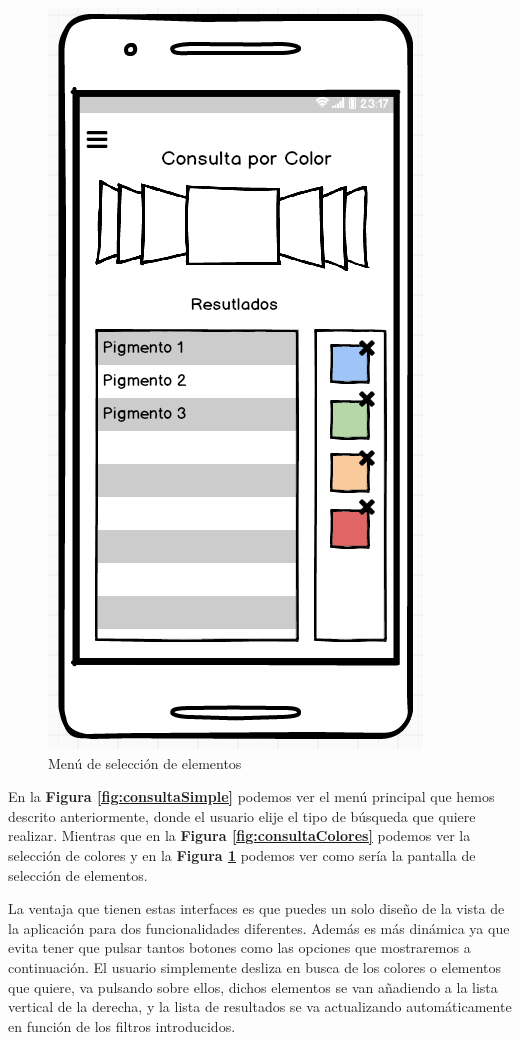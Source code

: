 \begin{multicols}{3}
    \begin{figure}[H]
    \centering
    \includegraphics[scale=0.5]{imagenes/diseno/color1.png}
    \caption{Menú de selección de elementos}
    \label{fig:consultaElementos}
    \end{figure}
\end{multicols}

En la \textbf{Figura \ref{fig:consultaSimple}} podemos ver el menú principal que hemos descrito anteriormente, donde el usuario elije el tipo de búsqueda que quiere realizar. Mientras que en la \textbf{Figura \ref{fig:consultaColores}} podemos ver la selección de colores y en la \textbf{Figura \ref{fig:consultaElementos}} podemos ver como sería la pantalla de selección de elementos. 

La ventaja que tienen estas interfaces es que puedes un solo diseño de la vista de la aplicación para dos funcionalidades diferentes. Además es más dinámica ya que evita tener que pulsar tantos botones como las opciones que mostraremos a continuación. El usuario simplemente desliza en busca de los colores o elementos que quiere, va pulsando sobre ellos, dichos elementos se van añadiendo a la lista vertical de la derecha, y la lista de resultados se va actualizando automáticamente en función de los filtros introducidos. 

